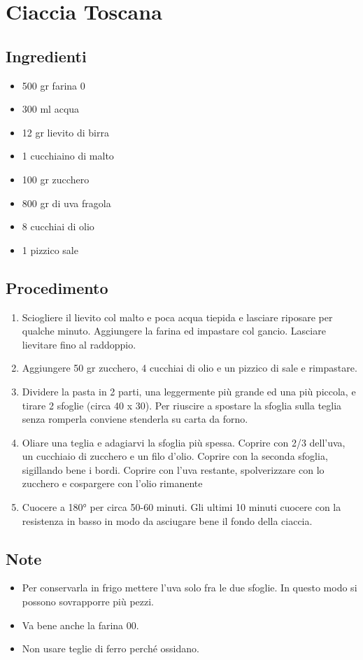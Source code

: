 \section{Ciaccia Toscana}
\subsection{Ingredienti}
\begin{itemize}
\item 500 gr farina 0  
\item 300 ml acqua  
\item 12 gr lievito di birra  
\item 1 cucchiaino di malto  
\item 100 gr zucchero  
\item 800 gr di uva fragola  
\item 8 cucchiai di olio  
\item 1 pizzico sale
\end{itemize}
\subsection{Procedimento}
\begin{enumerate}
\item  Sciogliere il lievito col malto e poca acqua tiepida e lasciare riposare per qualche minuto. Aggiungere la farina ed impastare col gancio. Lasciare lievitare fino al raddoppio.  
\item  Aggiungere 50 gr zucchero, 4 cucchiai di olio e un pizzico di sale e rimpastare.  
\item  Dividere la pasta in 2 parti, una leggermente più grande ed una più piccola, e tirare 2 sfoglie (circa 40 x 30). Per riuscire a spostare la sfoglia sulla teglia senza romperla conviene stenderla su carta da forno.  
\item  Oliare una teglia e adagiarvi la sfoglia più spessa. Coprire con 2/3 dell'uva, un cucchiaio di zucchero e un filo d'olio. Coprire con la seconda sfoglia, sigillando bene i bordi. Coprire con l'uva restante, spolverizzare con lo zucchero e cospargere con l'olio rimanente  
\item  Cuocere a 180° per circa 50-60 minuti. Gli ultimi 10 minuti cuocere con la resistenza in basso in modo da asciugare bene il fondo della ciaccia. 
\end{enumerate}
\subsection{Note}
\begin{itemize}
\item Per conservarla in frigo mettere l'uva solo fra le due sfoglie. In questo modo si possono sovrapporre più pezzi.  
\item Va bene anche la farina 00.  
\item Non usare teglie di ferro perché ossidano.
\end{itemize}
